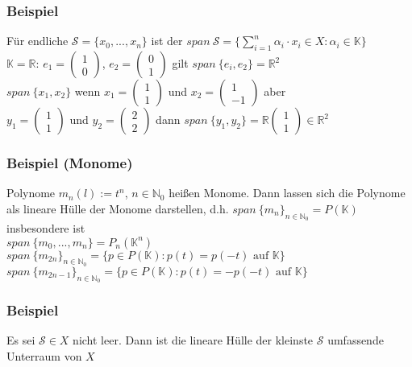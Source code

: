 \subsubsection{Beispiel}
Für endliche $\mathcal{S}=\{x_0,...,x_n\}$ ist der $\displaystyle span\ \mathcal{S}=\{\sum^n_{i=1} \alpha_i\cdot x_i\in X: \alpha_i \in \mathbb{K}\}$\\
$\mathbb{K}=\mathbb{R}$: $e_1=\begin{pmatrix}1\\0\end{pmatrix}$, $e_2=\begin{pmatrix}0\\1\end{pmatrix}$ gilt $span\ \{e_i,e_2\}=\mathbb{R}^2$\\
$span\ \{x_1,x_2\}$ wenn $x_1=\begin{pmatrix}1\\1\end{pmatrix}$ und $x_2=\begin{pmatrix}1\\-1\end{pmatrix}$ aber\\
$y_1=\begin{pmatrix}1\\1\end{pmatrix}$ und $y_2=\begin{pmatrix}2\\2\end{pmatrix}$ dann $span\ \{y_1,y_2\} = \mathbb{R} \begin{pmatrix}1\\1\end{pmatrix} \in \mathbb{R}^2$ 
\subsubsection{Beispiel (Monome)}
Polynome $m_n(l):=t^n$, $n\in\mathbb{N}_0$ heißen Monome. Dann lassen sich die Polynome als lineare Hülle der Monome darstellen, d.h. $span\ \{m_n\}_{n\in\mathbb{N}_0}=P(\mathbb{K})$ insbesondere ist\\
$span\ \{m_0,...,m_n\}=P_n(\mathbb{K}^n)$\\
$span\ \{m_{2n}\}_{n\in\mathbb{N}_0}=\{p\in P(\mathbb{K}):p(t)=p(-t) \text{ auf } \mathbb{K}\}$\\
$span\ \{m_{2n-1}\}_{n\in\mathbb{N}_0}=\{p\in P(\mathbb{K}):p(t)=-p(-t) \text{ auf } \mathbb{K}\}$
\subsubsection{Beispiel}
Es sei $\mathcal{S}\in X$ nicht leer. Dann ist die lineare Hülle der kleinste $\mathcal{S}$ umfassende Unterraum von $X$\\
